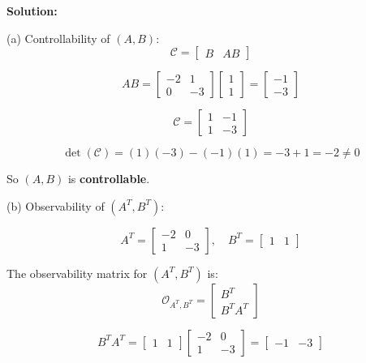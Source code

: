\textbf{Solution:}

(a) Controllability of $(A, B)$:
\begin{equation}
\mathcal{C} = \begin{bmatrix} B & AB \end{bmatrix}
\end{equation}

\begin{equation}
AB = \begin{bmatrix} -2 & 1 \\ 0 & -3 \end{bmatrix} \begin{bmatrix} 1 \\ 1 \end{bmatrix} = \begin{bmatrix} -1 \\ -3 \end{bmatrix}
\end{equation}

\begin{equation}
\mathcal{C} = \begin{bmatrix} 1 & -1 \\ 1 & -3 \end{bmatrix}
\end{equation}

\begin{equation}
\det(\mathcal{C}) = (1)(-3) - (-1)(1) = -3 + 1 = -2 \neq 0
\end{equation}

So $(A, B)$ is \textbf{controllable}.

(b) Observability of $(A^T, B^T)$:

\begin{equation}
A^T = \begin{bmatrix} -2 & 0 \\ 1 & -3 \end{bmatrix}, \quad
B^T = \begin{bmatrix} 1 & 1 \end{bmatrix}
\end{equation}

The observability matrix for $(A^T, B^T)$ is:
\begin{equation}
\mathcal{O}_{A^T, B^T} = \begin{bmatrix} B^T \\ B^T A^T \end{bmatrix}
\end{equation}

\begin{equation}
B^T A^T = \begin{bmatrix} 1 & 1 \end{bmatrix} \begin{bmatrix} -2 & 0 \\ 1 & -3 \end{bmatrix} = \begin{bmatrix} -1 & -3 \end{bmatrix}
\end{equation}

